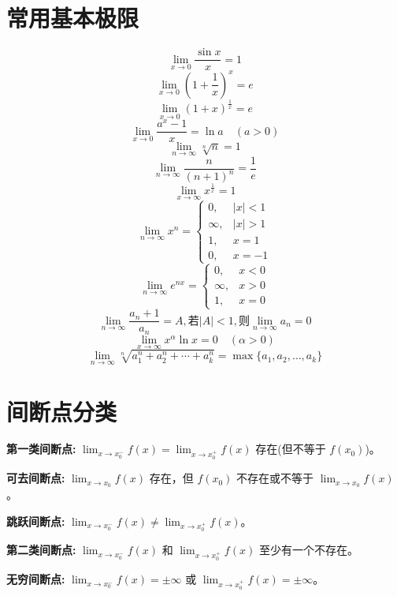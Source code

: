 \documentclass[10pt]{article}
\begin{document}
\newpage
\begin{multicols*}{2}
\raggedcolumns


\section*{常用基本极限}
\vspace{-8pt}

\[\lim_{x \to 0} \frac{\sin x}{x} = 1\]
\[\lim_{x \to 0} (1 + \frac{1}{x})^x = e\]
\[\lim_{x \to 0} (1 + x)^{\frac{1}{x}} = e\]
\[\lim_{x \to 0} \frac{a^x - 1}{x} = \ln a \quad (a > 0)\]
\[\lim_{n \to \infty} \sqrt[n]{n} = 1\]
\[\lim_{n \to \infty} \frac{n}{(n + 1)^n} = \frac{1}{e}\]
\[\lim_{x \to \infty} x^{\frac{1}{x}} = 1\]
\[\lim_{n \to \infty} x^n = \begin{cases} 0, & |x| < 1 \\ \infty, & |x| > 1 \\ 1, & x = 1 \\ 0, & x = -1 \end{cases}\]
\[\lim_{n \to \infty} e^{nx} = \begin{cases} 0, & x < 0 \\ \infty, & x > 0 \\ 1, & x = 0 \end{cases}\]
\[\lim_{n \to \infty} \frac{a_n + 1}{a_n} = A, \text{若} |A| < 1, \text{则} \lim_{n \to \infty} a_n = 0\]
\[\lim_{x \to \infty} x^\alpha \ln x = 0 \quad (\alpha > 0)\]
\[\lim_{n \to \infty} \sqrt[n]{a_1^n + a_2^n + \cdots + a_k^n} = \max\{a_1, a_2, \ldots, a_k\}\]

\section*{间断点分类}
\vspace{-8pt}

\textbf{第一类间断点:} \(\lim_{x \to x_0^-} f(x) = \lim_{x \to x_0^+} f(x)\) 存在(但不等于 \(f(x_0)\))。

\textbf{可去间断点:} \(\lim_{x \to x_0} f(x)\) 存在，但 \(f(x_0)\) 不存在或不等于 \(\lim_{x \to x_0} f(x)\)。

\textbf{跳跃间断点:} \(\lim_{x \to x_0^-} f(x) \neq \lim_{x \to x_0^+} f(x)\)。

\textbf{第二类间断点:} \(\lim_{x \to x_0^-} f(x)\) 和 \(\lim_{x \to x_0^+} f(x)\) 至少有一个不存在。

\textbf{无穷间断点:} \(\lim_{x \to x_0^-} f(x) = \pm \infty\) 或 \(\lim_{x \to x_0^+} f(x) = \pm \infty\)。


\end{multicols*}
\end{document}
